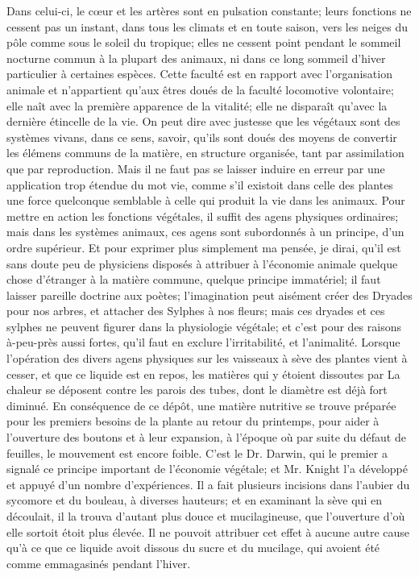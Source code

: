 Dans celui-ci, le cœur et les artères sont en pulsation constante; leurs fonctions ne cessent pas un instant, dans tous les climats et en toute saison, vers les neiges du pôle comme sous le soleil du tropique; elles ne cessent point pendant le sommeil nocturne commun à la plupart des animaux, ni dans ce long sommeil d'hiver particulier à certaines espèces. Cette faculté est en rapport avec l'organisation animale et n'appartient qu'aux êtres doués de la faculté locomotive volontaire; elle naît avec la première apparence de la vitalité; elle ne disparaît qu'avec la dernière étincelle de la vie.
On peut dire avec justesse que les végétaux sont des systèmes vivans, dans ce sens, savoir, qu'ils sont doués des moyens de convertir les élémens communs de la matière,\setcounter{page}{103} en structure organisée, tant par assimilation que par reproduction. Mais il ne faut pas se laisser induire en erreur par une application trop étendue du mot vie, comme s'il existoit dans celle des plantes une force quelconque semblable à celle qui produit la vie dans les animaux. Pour mettre en action les fonctions végétales, il suffit des agens physiques ordinaires; mais dans les systèmes animaux, ces agens sont subordonnés à un principe, d'un ordre supérieur. Et pour exprimer plus simplement ma pensée, je dirai, qu'il est sans doute peu de physiciens disposés à attribuer à l'économie animale quelque chose d'étranger à la matière commune, quelque principe immatériel; il faut laisser pareille doctrine aux poètes; l'imagination peut aisément créer des Dryades pour nos arbres, et attacher des Sylphes à nos fleurs; mais ces dryades et ces sylphes ne peuvent figurer dans la physiologie végétale; et c'est pour des raisons à-peu-près aussi fortes, qu'il faut en exclure l'irritabilité, et l'animalité.
Lorsque l'opération des divers agens physiques sur les vaisseaux à sève des plantes vient à cesser, et que ce liquide est en repos, les matières qui y étoient dissoutes par\setcounter{page}{104} La chaleur se déposent contre les parois des tubes, dont le diamètre est déjà fort diminué. En conséquence de ce dépôt, une matière nutritive se trouve préparée pour les premiers besoins de la plante au retour du printemps, pour aider à l'ouverture des boutons et à leur expansion, à l'époque où par suite du défaut de feuilles, le mouvement est encore foible.
C'est le Dr. Darwin, qui le premier a signalé ce principe important de l'économie végétale; et Mr. Knight l'a développé et appuyé d'un nombre d'expériences.
Il a fait plusieurs incisions dans l'aubier du sycomore et du bouleau, à diverses hauteurs; et en examinant la sève qui en découlait, il la trouva d'autant plus douce et mucilagineuse, que l'ouverture d'où elle sortoit étoit plus élevée. Il ne pouvoit attribuer cet effet à aucune autre cause qu'à ce que ce liquide avoit dissous du sucre et du mucilage, qui avoient été comme emmagasinés pendant l'hiver.
